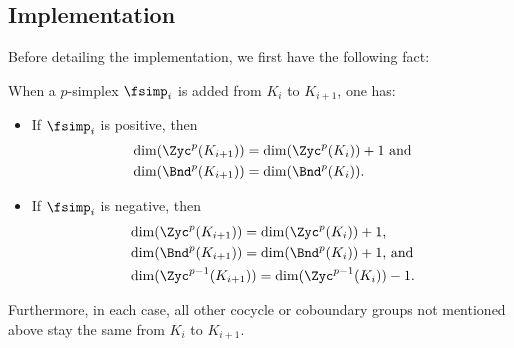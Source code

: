 \subsection{Implementation}\label{sec:impl}
Before detailing the implementation,
we first have the following fact:

\begin{proposition}\label{prop:dim-chng}
When  a $p$-simplex $\fsimp_i$ is added  from $K_i$ to $K_{i+1}$,
one has:
   \begin{itemize}
   \item If $\fsimp_i$ is positive, then 
   \begin{align*}
       &\dim(\Zyc^p(K_{i+1}))=\dim(\Zyc^p(K_{i}))+1\text{ and}\\
   &\dim(\Bnd^p(K_{i+1}))=\dim(\Bnd^p(K_{i})).
   \end{align*}

   \item If $\fsimp_i$ is negative, then
   \begin{align*}
   &\dim(\Zyc^p(K_{i+1}))=\dim(\Zyc^p(K_{i}))+1\text{, }\\
   &\dim(\Bnd^{p}(K_{i+1}))=\dim(\Bnd^{p}(K_{i}))+1\text{, and}\\
   &\dim(\Zyc^{p-1}(K_{i+1}))=\dim(\Zyc^{p-1}(K_{i}))-1.
   \end{align*}
   \end{itemize}
Furthermore, in each case, all other cocycle or coboundary  groups not mentioned above stay the same
from $K_i$ to $K_{i+1}$.
\end{proposition}
